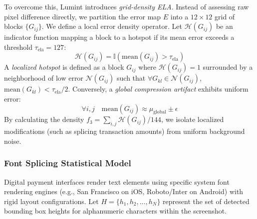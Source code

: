 To overcome this, Lumint introduces \textit{grid-density ELA}. Instead of assessing raw pixel difference directly, we partition the error map $E$ into a $12 \times 12$ grid of blocks $\{G_{ij}\}$. We define a local error density operator. Let $\mathcal{H}(G_{ij})$ be an indicator function mapping a block to a hotspot if its mean error exceeds a threshold $\tau_{\text{ela}} = 127$:
\begin{equation}
    \mathcal{H}(G_{ij}) = \mathbb{I}(\text{mean}(G_{ij}) > \tau_{\text{ela}})
\end{equation}
A \textit{localized hotspot} is defined as a block $G_{ij}$ where $\mathcal{H}(G_{ij}) = 1$ surrounded by a neighborhood of low error $\mathcal{N}(G_{ij})$ such that $\forall G_{kl} \in \mathcal{N}(G_{ij})$, $\text{mean}(G_{kl}) < \tau_{\text{ela}}/2$. Conversely, a \textit{global compression artifact} exhibits uniform error:
\begin{equation}
    \forall i,j \quad \text{mean}(G_{ij}) \approx \mu_{\text{global}} \pm \epsilon
\end{equation}
By calculating the density $f_3 = \sum_{i,j} \mathcal{H}(G_{ij}) / 144$, we isolate localized modifications (such as splicing transaction amounts) from uniform background noise.

\subsubsection{Font Splicing Statistical Model}
Digital payment interfaces render text elements using specific system font rendering engines (e.g., San Francisco on iOS, Roboto/Inter on Android) with rigid layout configurations. Let $H = \{h_1, h_2, \dots, h_N\}$ represent the set of detected bounding box heights for alphanumeric characters within the screenshot.

